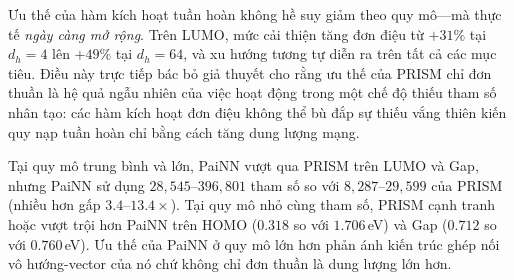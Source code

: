 \documentclass[10pt,twocolumn,letterpaper]{article}
\begin{document}
\begin{table}[h]
\centering
\small
\caption{\textbf{Phân tích Cắt bỏ Mở rộng Tham số} ($N = 1{,}000$, 3 hạt giống). PRISM so với Bản song sinh Cổ điển khi tăng số chiều ẩn. PRISM và Bản song sinh khớp cùng số lượng tham số tại từng quy mô. Ưu thế của hàm kích hoạt tuần hoàn \textit{tăng trưởng} cùng dung lượng mô hình. PaiNN được đưa ra để tham khảo (không cùng số tham số).}
\label{tab:param_scaling}
\end{table}

Ưu thế của hàm kích hoạt tuần hoàn không hề suy giảm theo quy mô---mà thực tế \textit{ngày càng mở rộng}. Trên LUMO, mức cải thiện tăng đơn điệu từ $+31\%$ tại $d_h = 4$ lên $+49\%$ tại $d_h = 64$, và xu hướng tương tự diễn ra trên tất cả các mục tiêu. Điều này trực tiếp bác bỏ giả thuyết cho rằng ưu thế của PRISM chỉ đơn thuần là hệ quả ngẫu nhiên của việc hoạt động trong một chế độ thiếu tham số nhân tạo: các hàm kích hoạt đơn điệu không thể bù đắp sự thiếu vắng thiên kiến quy nạp tuần hoàn chỉ bằng cách tăng dung lượng mạng.

Tại quy mô trung bình và lớn, PaiNN vượt qua PRISM trên LUMO và Gap, nhưng PaiNN sử dụng $28{,}545$--$396{,}801$ tham số so với $8{,}287$--$29{,}599$ của PRISM (nhiều hơn gấp $3.4$--$13.4\times$). Tại quy mô nhỏ cùng tham số, PRISM cạnh tranh hoặc vượt trội hơn PaiNN trên HOMO ($0.318$ so với $1.706$\,eV) và Gap ($0.712$ so với $0.760$\,eV). Ưu thế của PaiNN ở quy mô lớn hơn phản ánh kiến trúc ghép nối vô hướng-vector của nó chứ không chỉ đơn thuần là dung lượng lớn hơn.
\end{document}
